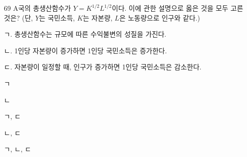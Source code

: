 \begin{question}{69}
A국의 총생산함수가 $Y = K^{1/2}L^{1/2}$이다. 이에 관한 설명으로 옳은 것을 모두 고른 것은? (단, $Y$는 국민소득, $K$는 자본량, $L$은 노동량으로 인구와 같다.)
\begin{framedtext}
ㄱ. 총생산함수는 규모에 따른 수익불변의 성질을 가진다. \par
ㄴ. 1인당 자본량이 증가하면 1인당 국민소득은 증가한다. \par
ㄷ. 자본량이 일정할 때, 인구가 증가하면 1인당 국민소득은 감소한다. \par
\end{framedtext}
\begin{choices}
  \item ㄱ
  \item ㄴ
  \item ㄱ, ㄷ
  \item ㄴ, ㄷ
  \item ㄱ, ㄴ, ㄷ
\end{choices}
\end{question}
